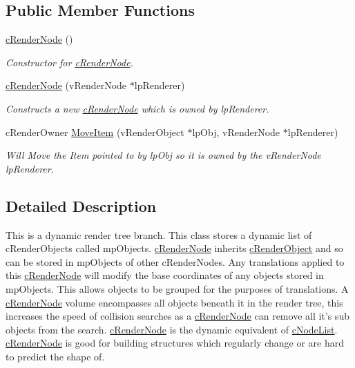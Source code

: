 \subsection*{Public Member Functions}
\begin{DoxyCompactItemize}
\item 
\hypertarget{classc_render_node_aeb068139475cb6af0aa41efc656e331d}{
\hyperlink{classc_render_node_aeb068139475cb6af0aa41efc656e331d}{cRenderNode} ()}
\label{classc_render_node_aeb068139475cb6af0aa41efc656e331d}

\begin{DoxyCompactList}\small\item\em Constructor for \hyperlink{classc_render_node}{cRenderNode}. \end{DoxyCompactList}\item 
\hypertarget{classc_render_node_a488098aa448aecae1524a56795f9512b}{
\hyperlink{classc_render_node_a488098aa448aecae1524a56795f9512b}{cRenderNode} (vRenderNode $\ast$lpRenderer)}
\label{classc_render_node_a488098aa448aecae1524a56795f9512b}

\begin{DoxyCompactList}\small\item\em Constructs a new \hyperlink{classc_render_node}{cRenderNode} which is owned by lpRenderer. \end{DoxyCompactList}\item 
\hypertarget{classc_render_node_a8babcc73316758de50745139f2a56923}{
cRenderOwner \hyperlink{classc_render_node_a8babcc73316758de50745139f2a56923}{MoveItem} (vRenderObject $\ast$lpObj, vRenderNode $\ast$lpRenderer)}
\label{classc_render_node_a8babcc73316758de50745139f2a56923}

\begin{DoxyCompactList}\small\item\em Will Move the Item pointed to by lpObj so it is owned by the vRenderNode lpRenderer. \end{DoxyCompactList}\end{DoxyCompactItemize}


\subsection{Detailed Description}
This is a dynamic render tree branch. This class stores a dynamic list of cRenderObjects called mpObjects. \hyperlink{classc_render_node}{cRenderNode} inherits \hyperlink{classc_render_object}{cRenderObject} and so can be stored in mpObjects of other cRenderNodes. Any translations applied to this \hyperlink{classc_render_node}{cRenderNode} will modify the base coordinates of any objects stored in mpObjects. This allows objects to be grouped for the purposes of translations. A \hyperlink{classc_render_node}{cRenderNode} volume encompasses all objects beneath it in the render tree, this increases the speed of collision searches as a \hyperlink{classc_render_node}{cRenderNode} can remove all it's sub objects from the search. \hyperlink{classc_render_node}{cRenderNode} is the dynamic equivalent of \hyperlink{classc_node_list}{cNodeList}. \hyperlink{classc_render_node}{cRenderNode} is good for building structures which regularly change or are hard to predict the shape of. 